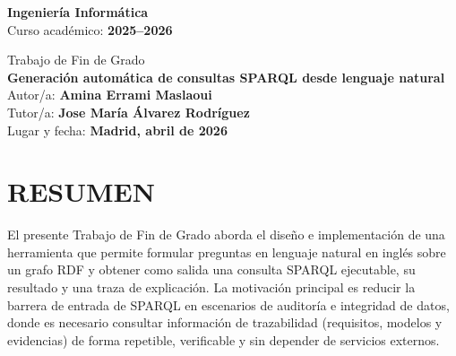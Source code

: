 \documentclass[12pt,a4paper]{article}
\newcommand{\tfgDegree}{\textbf{Ingeniería Informática}}
\newcommand{\tfgAcademicYear}{Curso académico: \textbf{2025--2026}}
\newcommand{\tfgTitle}{\textbf{Generación automática de consultas SPARQL desde lenguaje natural}}
\newcommand{\tfgAuthor}{Autor/a: \textbf{Amina Errami Maslaoui}}
\newcommand{\tfgSupervisor}{Tutor/a: \textbf{Jose María Álvarez Rodríguez}}
\newcommand{\tfgPlaceDate}{Lugar y fecha: \textbf{Madrid, abril de 2026}}
\begin{document}
\justifying
{}
\setlength{\parskip}{6pt}
\setlength{\parindent}{0pt}

\setcounter{secnumdepth}{0}
\setcounter{tocdepth}{3}

\setcounter{page}{1}

\begin{titlepage}
\thispagestyle{empty}
\begin{center}
\vspace*{1.5cm}

{\Large \tfgDegree \\
\vspace{0.2cm}
\tfgAcademicYear}

\vspace{2.0cm}
{\LARGE Trabajo de Fin de Grado}\\
\vspace{0.8cm}
{\Huge \tfgTitle}\\

\vfill
{\large \tfgAuthor}\\
\vspace{0.2cm}
{\large \tfgSupervisor}\\
\vspace{0.8cm}
{\large \tfgPlaceDate}\\


\end{center}
\end{titlepage}

\clearpage
\thispagestyle{empty}
\null
\clearpage

\thispagestyle{plain}
\section*{RESUMEN}
\noindent
El presente Trabajo de Fin de Grado aborda el diseño e implementación de una herramienta que permite formular preguntas en lenguaje natural en inglés sobre un grafo RDF y obtener como salida una consulta SPARQL ejecutable, su resultado y una traza de explicación. La motivación principal es reducir la barrera de entrada de SPARQL en escenarios de auditoría e integridad de datos, donde es necesario consultar información de trazabilidad (requisitos, modelos y evidencias) de forma repetible, verificable y sin depender de servicios externos.
\end{document}

